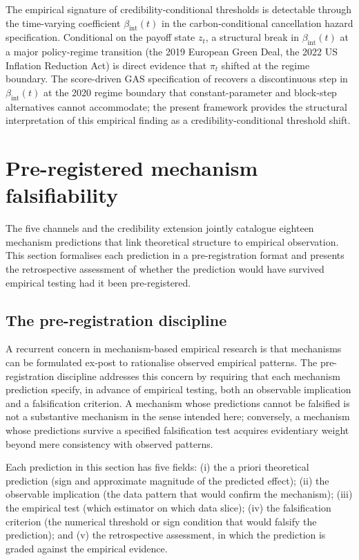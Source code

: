 \documentclass[12pt,a4paper]{article}
\newcommand{\bint}{\beta_{\text{int}}}
\theoremstyle{plain}
\theoremstyle{definition}
\begin{document}
The empirical signature of credibility-conditional thresholds is detectable through the time-varying coefficient $\bint(t)$ in the carbon-conditional cancellation hazard specification. Conditional on the payoff state $z_t$, a structural break in $\bint(t)$ at a major policy-regime transition (the 2019 European Green Deal, the 2022 US Inflation Reduction Act) is direct evidence that $\pi_t$ shifted at the regime boundary. The score-driven GAS specification of \cite{saakstra2026paper1} recovers a discontinuous step in $\bint(t)$ at the 2020 regime boundary that constant-parameter and block-step alternatives cannot accommodate; the present framework provides the structural interpretation of this empirical finding as a credibility-conditional threshold shift.

\section{Pre-registered mechanism falsifiability}
\label{sec:falsifiability}

The five channels and the credibility extension jointly catalogue eighteen mechanism predictions that link theoretical structure to empirical observation. This section formalises each prediction in a pre-registration format and presents the retrospective assessment of whether the prediction would have survived empirical testing had it been pre-registered.

\subsection{The pre-registration discipline}
\label{sec:falsifiability-discipline}

A recurrent concern in mechanism-based empirical research is that mechanisms can be formulated ex-post to rationalise observed empirical patterns. The pre-registration discipline addresses this concern by requiring that each mechanism prediction specify, in advance of empirical testing, both an observable implication and a falsification criterion. A mechanism whose predictions cannot be falsified is not a substantive mechanism in the sense intended here; conversely, a mechanism whose predictions survive a specified falsification test acquires evidentiary weight beyond mere consistency with observed patterns.

Each prediction in this section has five fields: (i) the a priori theoretical prediction (sign and approximate magnitude of the predicted effect); (ii) the observable implication (the data pattern that would confirm the mechanism); (iii) the empirical test (which estimator on which data slice); (iv) the falsification criterion (the numerical threshold or sign condition that would falsify the prediction); and (v) the retrospective assessment, in which the prediction is graded against the empirical evidence.
\end{document}
